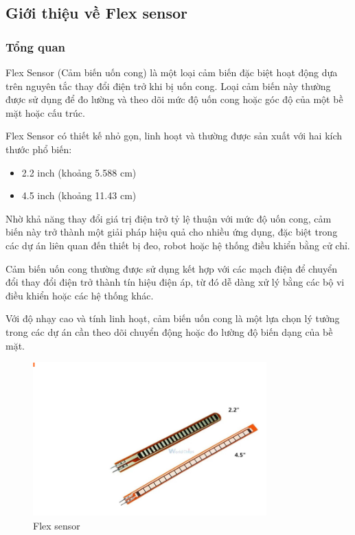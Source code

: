 \subsection{Giới thiệu về Flex sensor}


\subsubsection{Tổng quan} 

\indent Flex Sensor (Cảm biến uốn cong) là một loại cảm biến đặc biệt hoạt động dựa trên nguyên tắc thay đổi điện trở khi bị uốn cong. Loại cảm biến này thường được sử dụng để đo lường và theo dõi mức độ uốn cong hoặc góc độ của một bề mặt hoặc cấu trúc.

\indent Flex Sensor có thiết kế nhỏ gọn, linh hoạt và thường được sản xuất với hai kích thước phổ biến:
\begin{itemize}
    \item 2.2 inch (khoảng 5.588 cm)
    \item 4.5 inch (khoảng 11.43 cm)
\end{itemize}

\indent Nhờ khả năng thay đổi giá trị điện trở tỷ lệ thuận với mức độ uốn cong, cảm biến này trở thành một giải pháp hiệu quả cho nhiều ứng dụng, đặc biệt trong các dự án liên quan đến thiết bị đeo, robot hoặc hệ thống điều khiển bằng cử chỉ.

\indent Cảm biến uốn cong thường được sử dụng kết hợp với các mạch điện để chuyển đổi thay đổi điện trở thành tín hiệu điện áp, từ đó dễ dàng xử lý bằng các bộ vi điều khiển hoặc các hệ thống khác.

\indent Với độ nhạy cao và tính linh hoạt, cảm biến uốn cong là một lựa chọn lý tưởng trong các dự án cần theo dõi chuyển động hoặc đo lường độ biến dạng của bề mặt.

\begin{figure}[H]
    \centering
    \includegraphics[width=9cm]{Images/Theoretical basis/flex sensor.png}
\caption{Flex sensor}
\end{figure}

